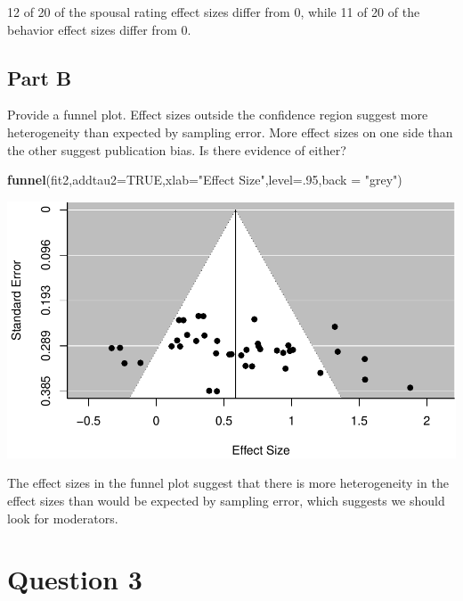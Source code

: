 \documentclass[]{article}
\newenvironment{Shaded}{\begin{snugshade}}{\end{snugshade}}
\newcommand{\KeywordTok}[1]{\textcolor[rgb]{0.13,0.29,0.53}{\textbf{#1}}}
\newcommand{\DataTypeTok}[1]{\textcolor[rgb]{0.13,0.29,0.53}{#1}}
\newcommand{\DecValTok}[1]{\textcolor[rgb]{0.00,0.00,0.81}{#1}}
\newcommand{\StringTok}[1]{\textcolor[rgb]{0.31,0.60,0.02}{#1}}
\newcommand{\OtherTok}[1]{\textcolor[rgb]{0.56,0.35,0.01}{#1}}
\newcommand{\NormalTok}[1]{#1}
\begin{document}
12 of 20 of the spousal rating effect sizes differ from 0, while 11 of
20 of the behavior effect sizes differ from 0.

\subsection{Part B}\label{part-b-1}

Provide a funnel plot. Effect sizes outside the confidence region
suggest more heterogeneity than expected by sampling error. More effect
sizes on one side than the other suggest publication bias. Is there
evidence of either?

\begin{Shaded}
\begin{Highlighting}[]
\KeywordTok{funnel}\NormalTok{(fit2,}\DataTypeTok{addtau2=}\OtherTok{TRUE}\NormalTok{,}\DataTypeTok{xlab=}\StringTok{"Effect Size"}\NormalTok{,}\DataTypeTok{level=}\NormalTok{.}\DecValTok{95}\NormalTok{,}\DataTypeTok{back =} \StringTok{"grey"}\NormalTok{)}
\end{Highlighting}
\end{Shaded}

\begin{center}\includegraphics{Beck_HW_9_files/figure-latex/unnamed-chunk-7-1} \end{center}

The effect sizes in the funnel plot suggest that there is more
heterogeneity in the effect sizes than would be expected by sampling
error, which suggests we should look for moderators.

\section{Question 3}\label{question-3}
\end{document}
